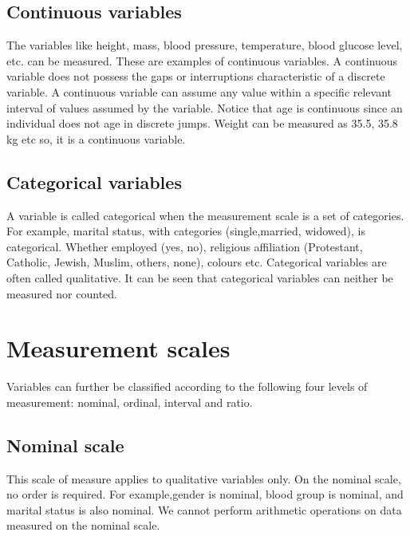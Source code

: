 \documentclass[
]{book}
\begin{document}
\hypertarget{continuous-variables}{%
\subsection{Continuous variables}\label{continuous-variables}}

The variables like height, mass, blood pressure, temperature, blood
glucose level, etc. can be measured. These are examples of continuous
variables. A continuous variable does not possess the gaps or
interruptions characteristic of a discrete variable. A continuous
variable can assume any value within a specific relevant interval of
values assumed by the variable. Notice that age is continuous since an
individual does not age in discrete jumps. Weight can be measured as
35.5, 35.8 kg etc so, it is a continuous variable.

\hypertarget{categorical-variables}{%
\subsection{Categorical variables}\label{categorical-variables}}

A variable is called categorical when the measurement scale is a set of
categories. For example, marital status, with categories
(single,married, widowed), is categorical. Whether employed (yes, no),
religious affiliation (Protestant, Catholic, Jewish, Muslim, others,
none), colours etc. Categorical variables are often called qualitative.
It can be seen that categorical variables can neither be measured nor
counted.

\hypertarget{measurement-scales}{%
\section{Measurement scales}\label{measurement-scales}}

Variables can further be classified according to the following four
levels of measurement: nominal, ordinal, interval and ratio.

\hypertarget{nominal-scale}{%
\subsection{Nominal scale}\label{nominal-scale}}

This scale of measure applies to qualitative variables only. On the
nominal scale, no order is required. For example,gender is nominal,
blood group is nominal, and marital status is also nominal. We cannot
perform arithmetic operations on data measured on the nominal scale.
\end{document}
